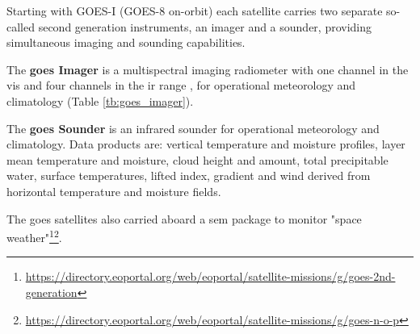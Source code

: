 \documentclass{article}
\begin{document}
Starting with GOES-I (GOES-8 on-orbit) each satellite carries two separate so-called second generation instruments, an imager and a sounder, providing simultaneous imaging and sounding capabilities. 

The \textbf{\ac{goes} Imager} is a multispectral imaging radiometer with one channel in the \ac{vis} and four channels in the \ac{ir} range , for operational meteorology and climatology (Table \ref{tb:goes_imager}). 


The \textbf{\ac{goes} Sounder}  is an infrared sounder for operational meteorology and climatology. Data products are: vertical temperature and moisture profiles, layer mean temperature and moisture, cloud height and amount, total precipitable water, surface temperatures, lifted index, gradient and wind derived from horizontal temperature and moisture fields.

The \ac{goes} satellites also carried aboard a \ac{sem} package to monitor "space weather"\footnote{\url{https://directory.eoportal.org/web/eoportal/satellite-missions/g/goes-2nd-generation}}\footnote{\url{https://directory.eoportal.org/web/eoportal/satellite-missions/g/goes-n-o-p}}.
\end{document}
